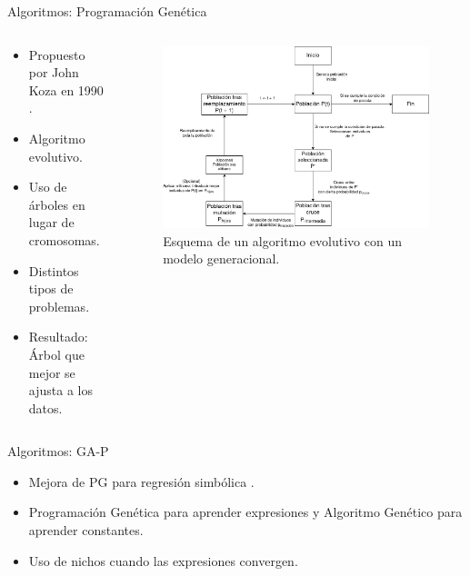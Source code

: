 \documentclass{beamer}
\begin{document}
\begin{frame}{Algoritmos: Programación Genética}

	\begin{columns}[T]

		\begin{column}{.4\textwidth}
			\begin{itemize}
				\item Propuesto por John Koza en 1990 \cite{kozaGP}.
				\item Algoritmo evolutivo.
				\item Uso de árboles en lugar de cromosomas.
				\item Distintos tipos de problemas.
				\item Resultado: Árbol que mejor se ajusta a los datos.
			\end{itemize}
		\end{column}


		\begin{column}{.6\textwidth}
			\begin{figure}[H]
			    \centering
				 \includegraphics[width=\textwidth]{generacional.png}
			    \caption{Esquema de un algoritmo evolutivo con un modelo generacional.}
				 \label{fig:modelo_generacioal}
			\end{figure}
		\end{column}

	\end{columns}

\end{frame}

\begin{frame}{Algoritmos: GA-P}
	\begin{itemize}
		\item Mejora de PG para regresión simbólica \cite{primerGAP}.
		\item Programación Genética para aprender expresiones y Algoritmo Genético para aprender constantes.
		\item Uso de nichos cuando las expresiones convergen.
	\end{itemize}

\end{frame}
\end{document}
